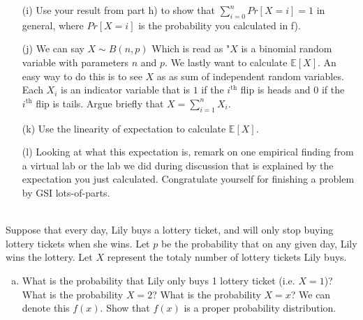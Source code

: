 \documentclass[]{article}
\newif\ifsolutions
\renewcommand{\answer}[1]{{\color{mydarkblue}\textbf{Solution:}#1}}
\begin{document}
\begin{qunlist}
\begin{enumerate}
\qpart
\item[(i)] Use your result from part h) to show that $\sum_{i=0}^n Pr[X=i] =1$ in general, where $Pr[X=i]$ is the probability you calculated in f).
\qpart
\item[(j)] We can say $X \sim B(n,p)$ Which is read as "$X$ is a binomial random variable with parameters $n$ and $p$. We lastly want to calculate $\mathbb{E}[X]$. An easy way to do this is to see $X$ as as sum of independent random variables. Each $X_i$ is an indicator variable that is $1$ if the $i^{\text{th}}$ flip is heads and $0$ if the $i^{\text{th}}$ flip is tails. Argue briefly that $X = \sum\nolimits_{i=1}^nX_i$.
\qpart
\item[(k)] Use the linearity of expectation to calculate $\mathbb{E}[X]$.
\qpart
\item[(l)] Looking at what this expectation is, remark on one empirical finding from a virtual lab or the lab we did during discussion that is explained by the expectation you just calculated. Congratulate yourself for finishing a problem by GSI lots-of-parts.
\end{enumerate}



 \\ Suppose that every day, Lily buys a lottery ticket, and will only stop buying lottery tickets when she wins.  Let $p$ be the probability that on any given day, Lily wins the lottery.  Let $X$ represent the totaly number of lottery tickets Lily buys.

\begin{enumerate}[a)]

\qpart
\item What is the probability that Lily only buys 1 lottery ticket (i.e. $X=1$)?  What is the probability $X=2$?  What is the probability $X=x$?  We can denote this $f(x)$.
Show that $f(x)$ is a proper probability distribution.

\ifsolutions{ \answer{ The probability of getting $(x-1)$ non-winning lottery tickets is $(1-p)^{x-1}$. Therefore the probability of getting $(x-1)$ non-winning tickets, then a winning ticket is
	\[ P(X=x) = (1-p)^{x-1} p. \]
	To show this is a valid probability distribution, we need to make sure the sum of $f(x)$ over all possible $x$ is 1. Using the formula for an infinite geometric series,
	\[ \sum_{x=1}^{\infty} f(x) = p \sum_{x=1}^{\infty} (1-p)^{x-1} = p \cdot \frac{1}{1-(1-p)} = 1. \]
}}\fi


\end{enumerate}
\end{qunlist}
\end{document}
